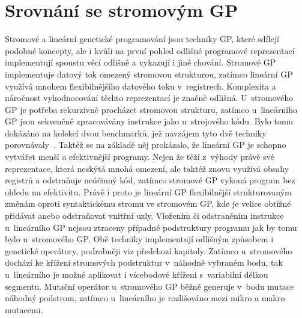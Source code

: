 \section{Srovnání se stromovým GP}
Stromové a lineární genetické programování jsou techniky GP, které sdílejí podobné koncepty, ale i kvůli na první pohled odlišné programové reprezentací implementují spoustu věcí odlišně a vykazují i jiné chování. Stromové GP implementuje datový tok omezený stromovou strukturou, zatímco lineární GP využívá mnohem flexibilnějšího datového toku v~registrech. Komplexita a náročnost vyhodnocování těchto reprezentací je značně odlišná. U~stromového GP je potřeba rekurzivně procházet stromovou strukturu, zatímco u~lineárního GP jsou sekvenčně zpracovávány instrukce jako u~strojového kódu. Bylo tomu dokázáno na kolekcí dvou benchmarků, jež navzájem tyto dvě techniky porovnávaly~\cite[kap. 8]{LGP}. Taktéž se na základě něj prokázalo, že lineární GP je schopno vytvářet menší a efektivnější programy. Nejen že těží z~výhody právě své reprezentace, která neskýtá mnohá omezení, ale taktéž znovu využívá obsahy registrů a odstraňuje neúčinný kód, zatímco stromové GP vykoná program bez ohledu na efektivitu. Právě i proto je lineární GP flexibilnější strukturovaným změnám oproti syntaktickému stromu ve stromovém GP, kde je velice obtížné přidávat anebo odstraňovat vnitřní uzly. Vložením či odstraněním instrukce u~lineárního GP nejsou ztraceny případné podstruktury programu jak by tomu bylo u~stromového GP. Obě techniky implementují odlišným způsobem i genetické operátory, podrobněji viz předchozí kapitoly. Zatímco u~stromového dochází ke křížení stromových podstruktur v~náhodně vybraném bodu, tak u~lineárního  je možné aplikovat i vícebodové kříženi s~variabilní délkou segmentu. Mutační operátor u~stromového GP běžně generuje v~bodu mutace náhodný podstrom, zatímco u~lineárního je rozlišováno mezi mikro a makro mutacemi.


